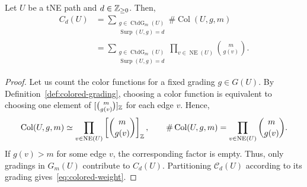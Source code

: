 \begin{lemma}\label{lem:colored-weight}
Let $U$ be a tNE path and $d\in\mathbb Z_{\ge0}$. Then,
\begin{equation}\label{eq:colored-weight}
\begin{aligned}
 C_d(U)&=\sum_{\substack{g\in\operatorname{CtdG}_m(U)\\\operatorname{Surp}(U,g)=d}}
           \#\operatorname{Col}(U,g,m)\\
 &=\sum_{\substack{g\in\operatorname{CtdG}_m(U)\\\operatorname{Surp}(U,g)=d}}
           \prod_{v\in \operatorname{NE}(U)}\binom{m}{g(v)}.
\end{aligned}
\end{equation}
\end{lemma}
\begin{proof}
Let us count the color functions for a fixed grading $g\in G(U)$.
By Definition~\ref{def:colored-grading}, choosing a color function is equivalent to
choosing one element of $[\binom m{g(v)}]_{\mathbb Z}$ for each edge $v$. Hence,
\[
 \operatorname{Col}(U,g,m)
 \simeq\prod_{v\in\operatorname{NE}(U)}\left[\binom m{g(v)}\right]_{\mathbb Z},\qquad
 \#\operatorname{Col}(U,g,m)=\prod_{v\in\operatorname{NE}(U)}\binom m{g(v)}.
\]
If $g(v)>m$ for some edge $v$, the corresponding factor is empty.
Thus, only gradings in $G_m(U)$ contribute to $C_d(U)$.
Partitioning $\mathcal C_d(U)$ according to its grading gives~\eqref{eq:colored-weight}.
\end{proof}

